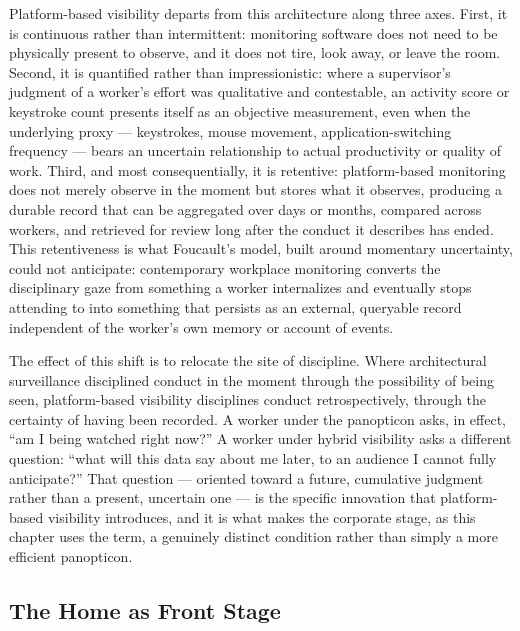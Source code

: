 \documentclass[10pt]{article}
\begin{document}
Platform-based visibility departs from this architecture along three axes. First, it is continuous rather than intermittent: monitoring software does not need to be physically present to observe, and it does not tire, look away, or leave the room. Second, it is quantified rather than impressionistic: where a supervisor's judgment of a worker's effort was qualitative and contestable, an activity score or keystroke count presents itself as an objective measurement, even when the underlying proxy --- keystrokes, mouse movement, application-switching frequency --- bears an uncertain relationship to actual productivity or quality of work. Third, and most consequentially, it is retentive: platform-based monitoring does not merely observe in the moment but stores what it observes, producing a durable record that can be aggregated over days or months, compared across workers, and retrieved for review long after the conduct it describes has ended. This retentiveness is what Foucault's model, built around momentary uncertainty, could not anticipate: contemporary workplace monitoring converts the disciplinary gaze from something a worker internalizes and eventually stops attending to into something that persists as an external, queryable record independent of the worker's own memory or account of events.

The effect of this shift is to relocate the site of discipline. Where architectural surveillance disciplined conduct in the moment through the possibility of being seen, platform-based visibility disciplines conduct retrospectively, through the certainty of having been recorded. A worker under the panopticon asks, in effect, ``am I being watched right now?'' A worker under hybrid visibility asks a different question: ``what will this data say about me later, to an audience I cannot fully anticipate?'' That question --- oriented toward a future, cumulative judgment rather than a present, uncertain one --- is the specific innovation that platform-based visibility introduces, and it is what makes the corporate stage, as this chapter uses the term, a genuinely distinct condition rather than simply a more efficient panopticon.

\subsection{The Home as Front Stage}
\end{document}
